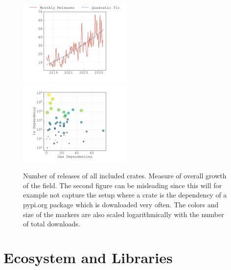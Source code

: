 \documentclass{article}
\begin{document}
\begin{figure}
    \centering
    \includegraphics[width=0.5\textwidth]{figures/crates-io-release-numbers.pdf}%
    \includegraphics[width=0.5\textwidth]{figures/crates-io-deps-downloads-scatter.pdf}
    \caption{
        Number of releases of all included crates.
        Measure of overall growth of the field.
        The second figure can be misleading since this will for example not capture the setup where
        a crate is the dependency of a pypi.org package which is downloaded very often.
        The colors and size of the markers are also scaled logarithmically with the number of total
        downloads.
    }
\end{figure}

\section{Ecosystem and Libraries}
\end{document}
